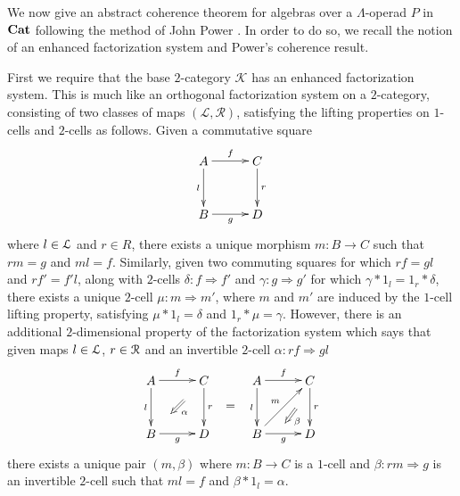 We now give an abstract coherence theorem for algebras over a $\Lambda$-operad $P$ in $\mathbf{Cat}$ following the method of John Power \cite{power-gen}. In order to do so, we recall the notion of an enhanced factorization system and Power's coherence result.

\begin{Defi}\label{Defi:efs}
First we require that the base $2$-category $\mathcal{K}$ has an enhanced factorization system. This is much like an orthogonal factorization system on a $2$-category, consisting of two classes of maps $(\mathcal{L},\mathcal{R})$, satisfying the lifting properties on $1$-cells and $2$-cells as follows. Given a commutative square
     \[
        \xy
            (0,0)*+{A}="00";
            (15,0)*+{C}="10";
            (0,-15)*+{B}="01";
            (15,-15)*+{D}="11";
            {\ar^{f} "00" ; "10"};
            {\ar^{r} "10" ; "11"};
            {\ar_{l} "00" ; "01"};
            {\ar_{g} "01" ; "11"};
        \endxy
     \]
where $l \in \mathcal{L}$ and $r \in {R}$, there exists a unique morphism $m \colon B \rightarrow C$ such that $rm = g$ and $ml = f$. Similarly, given two commuting squares for which $rf = gl$ and $rf' = f'l$, along with $2$-cells $\delta \colon f \Rightarrow f'$ and $\gamma \colon g \Rightarrow g'$ for which $\gamma \ast 1_l = 1_r \ast \delta$, there exists a unique $2$-cell $\mu \colon m \Rightarrow m'$, where $m$ and $m'$ are induced by the $1$-cell lifting property, satisfying $\mu \ast 1_l = \delta$ and $1_r \ast \mu = \gamma$. However, there is an additional $2$-dimensional property of the factorization system which says that given maps $l \in \mathcal{L}$, $r \in \mathcal{R}$ and an invertible $2$-cell $\alpha \colon rf \Rightarrow gl$
    \[
        \xy
            (0,0)*+{A}="00";
            (15,0)*+{C}="10";
            (0,-15)*+{B}="01";
            (15,-15)*+{D}="11";
            {\ar^{f} "00" ; "10"};
            {\ar^{r} "10" ; "11"};
            {\ar_{l} "00" ; "01"};
            {\ar_{g} "01" ; "11"};
            {\ar@{=>}^{\alpha} (9.375,-5.625) ; (5.625,-9.375)};
            (22.5,-7.5)*+{=};
            (30,0)*+{A}="20";
            (45,0)*+{C}="30";
            (30,-15)*+{B}="21";
            (45,-15)*+{D}="31";
            {\ar^{f} "20" ; "30"};
            {\ar^{r} "30" ; "31"};
            {\ar_{l} "20" ; "21"};
            {\ar_{g} "21" ; "31"};
            {\ar^{m} "21" ; "30"};
            {\ar@{=>}^{\beta} (41,-8) ; (38,-12)};
        \endxy
    \]
there exists a unique pair $(m,\beta)$ where $m \colon B \rightarrow C$ is a $1$-cell and $\beta \colon rm \Rightarrow g$ is an invertible $2$-cell such that $ml = f$ and $\beta \ast 1_{l} = \alpha$.
\end{Defi}

